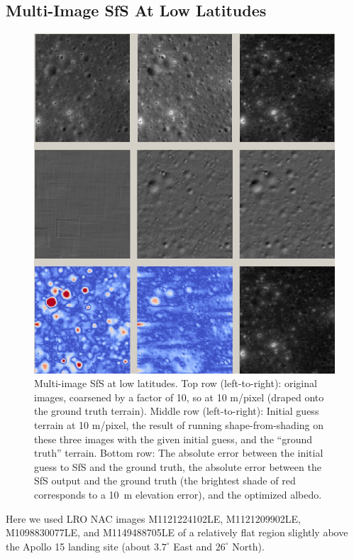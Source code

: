 \documentclass[12pt,oneside]{article}
\begin{document}
\subsection{Multi-Image SfS At Low Latitudes}
\label{multiple}

\begin{figure}[h!]
\includegraphics[width=6in]{figures/sfs2.jpg}
    \caption[Photoclinometry example]{
      \label{fig:sfs2} Multi-image SfS at low latitudes. Top row (left-to-right): original
      images, coarsened by a factor of 10, so at 10 m/pixel (draped
      onto the ground truth terrain). Middle row (left-to-right):
      Initial guess terrain at 10 m/pixel, the result of running
      shape-from-shading on these three images with the given initial
      guess, and the ``ground truth'' terrain. Bottom row: The absolute
      error between the initial guess to SfS and the ground truth, the absolute error
      between the SfS output and the ground truth (the brightest shade of
      red corresponds to a 10~m elevation error), and the optimized albedo.}
\end{figure}

Here we used LRO NAC images M1121224102LE, M1121209902LE, M1098830077LE, and M1149488705LE 
of a relatively flat region slightly above the Apollo 15
landing site (about $3.7^\circ$ East and $26^\circ$ North).
\end{document}
